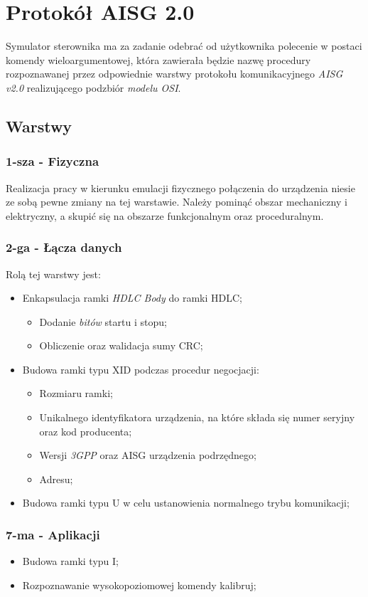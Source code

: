 \chapter{Protokół AISG 2.0}
	Symulator sterownika ma za zadanie odebrać od użytkownika polecenie w postaci komendy wieloargumentowej, 
	która zawierała będzie nazwę procedury rozpoznawanej przez odpowiednie warstwy protokołu komunikacyjnego \textit{AISG v2.0}
	realizującego podzbiór \textit{modelu OSI}\cite{ModelOSI}.
	
	\section{Warstwy}
		\subsection{1-sza - Fizyczna}
		Realizacja pracy w kierunku emulacji fizycznego połączenia do urządzenia niesie ze sobą pewne zmiany na tej warstawie.\newline
		Należy pominąć obszar mechaniczny i elektryczny\cite{ETSI-3GPP-0}, a skupić się na obszarze funkcjonalnym oraz proceduralnym.
		\subsection{2-ga - Łącza danych}
		Rolą tej warstwy jest\cite{ETSI-3GPP-2}:
		\begin{itemize}
			\item Enkapsulacja\cite{ENKAPSULACJA} ramki \textit{HDLC Body} do ramki HDLC\cite{WIKI_ENG_HDLC};
			\begin{itemize}
				\item Dodanie \textit{bitów} startu i stopu;
				\item Obliczenie oraz walidacja sumy CRC\cite{CRC};
			\end{itemize}
			\item Budowa ramki typu XID podczas procedur negocjacji:
			\begin{itemize}
				\item Rozmiaru ramki;
				\item Unikalnego identyfikatora urządzenia, na które składa się numer seryjny oraz kod producenta;
				\item Wersji \textit{3GPP} oraz AISG urządzenia podrzędnego;
				\item Adresu;
			\end{itemize}
			\item Budowa ramki typu U w celu ustanowienia normalnego trybu komunikacji;
		\end{itemize}
		\subsection{7-ma - Aplikacji}
			\begin{itemize}
				\item Budowa ramki typu I;
				\item Rozpoznawanie wysokopoziomowej komendy kalibruj\cite{ETSI-3GPP-7};
			\end{itemize}
